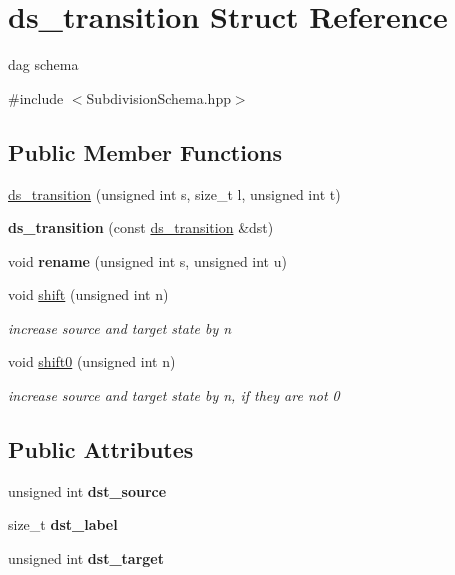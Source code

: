 \hypertarget{structds__transition}{}\section{ds\+\_\+transition Struct Reference}
\label{structds__transition}


dag schema  




{\ttfamily \#include $<$Subdivision\+Schema.\+hpp$>$}

\subsection*{Public Member Functions}
\begin{DoxyCompactItemize}
\item 
\mbox{\hyperlink{structds__transition_af0120de2744bb7e6eaebeb80c014cd2d}{ds\+\_\+transition}} (unsigned int s, size\+\_\+t l, unsigned int t)
\item 
\mbox{\label{structds__transition_a812425a6466f00721e3426430f4bd2bb}} 
{\bfseries ds\+\_\+transition} (const \mbox{\hyperlink{structds__transition}{ds\+\_\+transition}} \&dst)
\item 
void {\bfseries rename} (unsigned int s, unsigned int u)
\item 
void \mbox{\hyperlink{group__schemata_gaa6bf3664ce3ec4ceddc6fc0546e7af84}{shift}} (unsigned int n)
\begin{DoxyCompactList}\small\item\em increase source and target state by n \end{DoxyCompactList}\item 
void \mbox{\hyperlink{group__schemata_ga811afd94c0a2afda729115e1afade496}{shift0}} (unsigned int n)
\begin{DoxyCompactList}\small\item\em increase source and target state by n, if they are not 0 \end{DoxyCompactList}\end{DoxyCompactItemize}
\subsection*{Public Attributes}
\begin{DoxyCompactItemize}
\item 
\mbox{\label{structds__transition_a8abb4ba3aafb140f77b5adfce9f9c35e}} 
unsigned int {\bfseries dst\+\_\+source}
\item 
\mbox{\label{structds__transition_ad363afd9368d0aef7c1f967d860087d5}} 
size\+\_\+t {\bfseries dst\+\_\+label}
\item 
\mbox{\label{structds__transition_ad3882a8e6a30e09084584fcf0455268d}} 
unsigned int {\bfseries dst\+\_\+target}
\end{DoxyCompactItemize}


